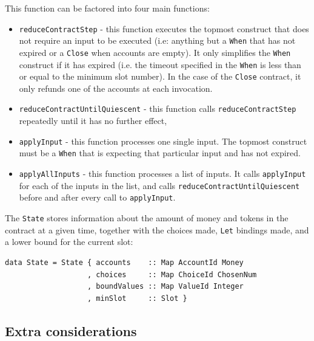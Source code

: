 \documentclass[english,runningheads]{llncs}
\begin{document}
This function can be factored into four main functions:
\begin{itemize}
\item \texttt{reduceContractStep} - this function executes the topmost
construct that does not require an input to be executed (i.e: anything
but a \texttt{When} that has not expired or a \texttt{Close} when
accounts are empty). It only simplifies the \texttt{When} construct
if it has expired (i.e. the timeout specified in the \texttt{When}
is less than or equal to the minimum slot number). In the case of
the \texttt{Close} contract, it only refunds one of the accounts at
each invocation. 
\item \texttt{reduceContractUntilQuiescent} - this function calls \texttt{reduceContractStep}
repeatedly until it has no further effect,
\item \texttt{applyInput} - this function processes one single input.
The topmost construct must be a \texttt{When} that
is expecting that particular input and has not expired. 
\item \texttt{applyAllInputs} - this function processes a list of inputs.
It calls \texttt{applyInput} for each of the inputs in the list, and
calls \texttt{reduceContractUntilQuiescent} before and after every
call to \texttt{applyInput}.
\end{itemize}
The \texttt{State} stores information about the amount of money and
tokens in the contract at a given time, together with the choices
made, \texttt{Let} bindings made, and a lower bound for the current
slot:

\begin{verbatim}
data State = State { accounts    :: Map AccountId Money
                   , choices     :: Map ChoiceId ChosenNum
                   , boundValues :: Map ValueId Integer
                   , minSlot     :: Slot }
\end{verbatim}

\subsection{Extra considerations\label{subsec:Extra-considerations}}
\end{document}
